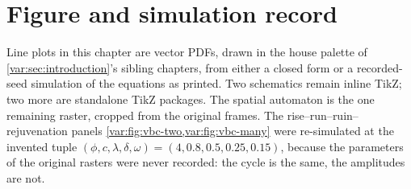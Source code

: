 
\section{Figure and simulation record}
\label{var:app:figures}

Line plots in this chapter are vector PDFs, drawn in the house palette of
\cref{var:sec:introduction}'s sibling chapters, from either a closed form or
a recorded-seed simulation of the equations as printed. Two schematics remain
inline TikZ; two more are standalone TikZ packages. The spatial automaton is
the one remaining raster, cropped from the original frames.
The rise--run--ruin--rejuvenation panels
\cref{var:fig:vbc-two,var:fig:vbc-many} were re-simulated at the invented
tuple $(\phi,c,\lambda,\delta,\omega)=(4,0.8,0.5,0.25,0.15)$, because the
parameters of the original rasters were never recorded: the cycle is the
same, the amplitudes are not.

